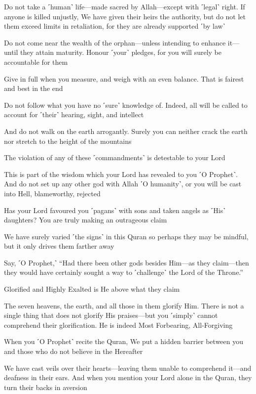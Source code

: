 Do not take a ˹human˺ life—made sacred by Allah—except with ˹legal˺ right. If anyone is killed unjustly, We have given their heirs the authority, but do not let them exceed limits in retaliation, for they are already supported ˹by law˺

Do not come near the wealth of the orphan—unless intending to enhance it—until they attain maturity. Honour ˹your˺ pledges, for you will surely be accountable for them

Give in full when you measure, and weigh with an even balance. That is fairest and best in the end

Do not follow what you have no ˹sure˺ knowledge of. Indeed, all will be called to account for ˹their˺ hearing, sight, and intellect

And do not walk on the earth arrogantly. Surely you can neither crack the earth nor stretch to the height of the mountains

The violation of any of these ˹commandments˺ is detestable to your Lord

This is part of the wisdom which your Lord has revealed to you ˹O Prophet˺. And do not set up any other god with Allah ˹O humanity˺, or you will be cast into Hell, blameworthy, rejected

Has your Lord favoured you ˹pagans˺ with sons and taken angels as ˹His˺ daughters? You are truly making an outrageous claim

We have surely varied ˹the signs˺ in this Quran so perhaps they may be mindful, but it only drives them farther away

Say, ˹O Prophet,˺ “Had there been other gods besides Him—as they claim—then they would have certainly sought a way to ˹challenge˺ the Lord of the Throne.”

Glorified and Highly Exalted is He above what they claim

The seven heavens, the earth, and all those in them glorify Him. There is not a single thing that does not glorify His praises—but you ˹simply˺ cannot comprehend their glorification. He is indeed Most Forbearing, All-Forgiving

When you ˹O Prophet˺ recite the Quran, We put a hidden barrier between you and those who do not believe in the Hereafter

We have cast veils over their hearts—leaving them unable to comprehend it—and deafness in their ears. And when you mention your Lord alone in the Quran, they turn their backs in aversion

